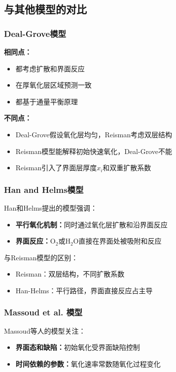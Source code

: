 \documentclass[UTF8,12pt,a4paper]{ctexart}
\begin{document}
\subsection{与其他模型的对比}

\subsubsection{Deal-Grove模型}

\textbf{相同点：}
\begin{itemize}
    \item 都考虑扩散和界面反应
    \item 在厚氧化层区域预测一致
    \item 都基于通量平衡原理
\end{itemize}

\textbf{不同点：}
\begin{itemize}
    \item Deal-Grove假设氧化层均匀，Reisman考虑双层结构
    \item Reisman模型能解释初始快速氧化，Deal-Grove不能
    \item Reisman引入了界面层厚度$x_i$和双重扩散系数
\end{itemize}

\subsubsection{Han and Helms模型}

Han和Helms提出的模型强调：
\begin{itemize}
    \item \textbf{平行氧化机制：}同时通过氧化层扩散和沿界面反应
    \item \textbf{界面反应：}O$_2$或H$_2$O直接在界面处被吸附和反应
\end{itemize}

与Reisman模型的区别：
\begin{itemize}
    \item Reisman：双层结构，不同扩散系数
    \item Han-Helms：平行路径，界面直接反应占主导
\end{itemize}

\subsubsection{Massoud et al. 模型}

Massoud等人的模型关注：
\begin{itemize}
    \item \textbf{界面态和缺陷：}初始氧化受界面缺陷控制
    \item \textbf{时间依赖的参数：}氧化速率常数随氧化过程变化
\end{itemize}
\end{document}
